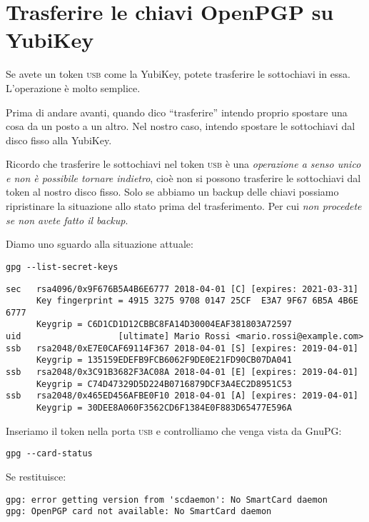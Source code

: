 \chapter{Trasferire le chiavi OpenPGP su YubiKey}

Se avete un token \textsc{usb} come la YubiKey, potete trasferire le sottochiavi
in essa. L'operazione è molto semplice.

Prima di andare avanti, quando dico ``trasferire'' intendo proprio spostare una
cosa da un posto a un altro. Nel nostro caso, intendo spostare le sottochiavi
dal disco fisso alla YubiKey.

Ricordo che trasferire le sottochiavi nel token \textsc{usb} è una
\emph{operazione a senso unico e non è possibile tornare indietro}, cioè non
si possono trasferire le sottochiavi dal token al nostro disco fisso. Solo se
abbiamo un backup delle chiavi possiamo ripristinare la situazione allo stato
prima del trasferimento. Per cui \emph{non procedete se non avete fatto il
backup}.

Diamo uno sguardo alla situazione attuale:

\begin{lstlisting}
gpg --list-secret-keys
\end{lstlisting}

\begin{lstlisting}
sec   rsa4096/0x9F676B5A4B6E6777 2018-04-01 [C] [expires: 2021-03-31]
      Key fingerprint = 4915 3275 9708 0147 25CF  E3A7 9F67 6B5A 4B6E 6777
      Keygrip = C6D1CD1D12CBBC8FA14D30004EAF381803A72597
uid                   [ultimate] Mario Rossi <mario.rossi@example.com>
ssb   rsa2048/0xE7E0CAF69114F367 2018-04-01 [S] [expires: 2019-04-01]
      Keygrip = 135159EDEFB9FCB6062F9DE0E21FD90CB07DA041
ssb   rsa2048/0x3C91B3682F3AC08A 2018-04-01 [E] [expires: 2019-04-01]
      Keygrip = C74D47329D5D224B0716879DCF3A4EC2D8951C53
ssb   rsa2048/0x465ED456AFBE0F10 2018-04-01 [A] [expires: 2019-04-01]
      Keygrip = 30DEE8A060F3562CD6F1384E0F883D65477E596A
\end{lstlisting}

Inseriamo il token nella porta \textsc{usb} e controlliamo che venga vista da
GnuPG:

\begin{lstlisting}
gpg --card-status
\end{lstlisting}

Se restituisce:

\begin{lstlisting}
gpg: error getting version from 'scdaemon': No SmartCard daemon
gpg: OpenPGP card not available: No SmartCard daemon
\end{lstlisting}


